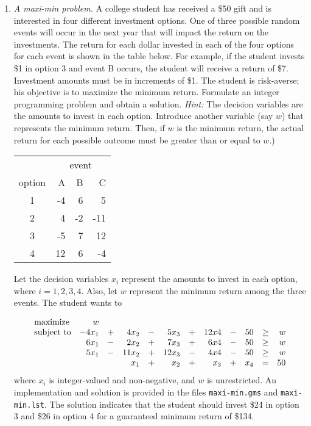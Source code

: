 \begin{enumerate}
\item \emph{A maxi-min problem.} A college student has received a \$50
  gift and is interested in four different investment options. One
  of three possible random events will occur in the next year that
  will impact the return on the investments. The return for each
  dollar invested in each of the four options for each event is
  shown in the table below. For example, if the student invests \$1 in
  option 3 and event B occurs, the student will receive a return of
  \$7.  Investment amounts must be in increments of \$1. The student is
risk-averse; his objective is to maximize the minimum return.
  Formulate an integer programming problem and obtain a
  solution.  \emph{Hint:} The decision variables are the amounts to
  invest in each option. Introduce another variable (say $w$) that
  represents the minimum return. Then, if $w$ is the minimum return,
  the actual return for each possible outcome must be greater than or
  equal to $w$.)

\begin{tabular}{c|rrr}
	& \multicolumn{3}{c}{event}\\
	option & A & B & C \\ \hline
	1 & -4 & 6 & 5 \\
	2 & 4 & -2 & -11 \\
	3 & -5 & 7 & 12 \\
	4 & 12 & 6 & -4
\end{tabular}
\vspace{.2in}

\begin{solution}
	\bs Let the decision variables $x_i$ represent the amounts to invest
	in each option, where $i = 1,2,3,4$. Also, let $w$ represent
	the minimum return among the three events. The student wants to
	
	\[
	\begin{array}{lrrrrrrrrrrr}
	\textrm{maximize} & w & \multicolumn{10}{c}{} \\
	\textrm{subject to} & -4x_1 & + & 4x_2 & - & 5x_3 & + & 12x4 &-&50&\geq & w \\
	& 6x_1 & - & 2x_2 & + & 7x_3 & + & 6x4 &-&50&\geq & w \\
	& 5x_1 & - & 11x_2 & + & 12x_3 & - & 4x4 &-&50&\geq & w \\
	&  & & x_1 & + & x_2 & + & x_3 &+&x_4& = & 50 \\
	\end{array}
	\]
	where $x_i$ is integer-valued and non-negative, and $w$ is
        unrestricted.  An implementation and solution is provided in
        the files \texttt{maxi-min.gms} and \texttt{maxi-min.lst}. The
        solution indicates that the student should invest \$24 in
        option 3 and \$26 in option 4 for a guaranteed minimum return
        of \$134.


\end{solution}
\end{enumerate}
